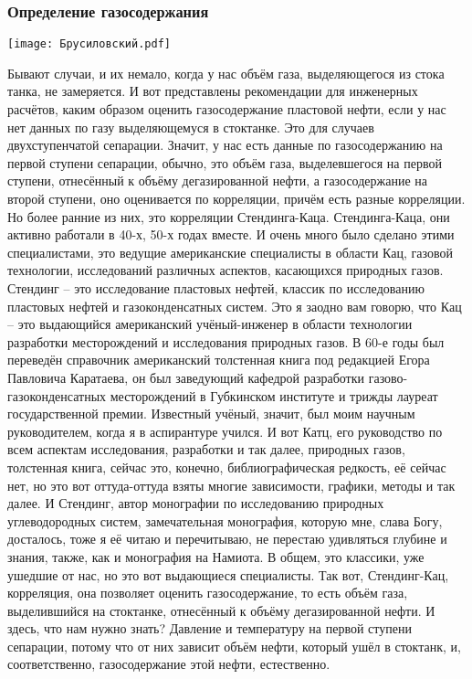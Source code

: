 \documentclass[main.tex]{subfiles}
\begin{document}
\subsubsection{Определение газосодержания}

\begin{center}
\texttt{[image: Брусиловский.pdf]}
\end{center}

Бывают случаи, и их немало, когда у нас объём газа, выделяющегося из стока танка, не замеряется.
И вот представлены рекомендации для инженерных расчётов, каким образом оценить газосодержание пластовой нефти, если у нас нет данных по газу выделяющемуся в стоктанке.
Это для случаев двухступенчатой сепарации.
Значит, у нас есть данные по газосодержанию на первой ступени сепарации, обычно, это объём газа, выделевшегося на первой ступени, отнесённый к объёму дегазированной нефти, а газосодержание на второй ступени, оно оценивается по корреляции, причём есть разные корреляции.
Но более ранние из них, это корреляции Стендинга-Каца.
Стендинга-Каца, они активно работали в 40-х, 50-х годах
вместе.
И очень много было сделано этими специалистами, это ведущие американские специалисты в области Кац, газовой технологии, исследований различных аспектов, касающихся природных газов.
Стендинг -- это исследование пластовых нефтей, классик по исследованию пластовых нефтей и газоконденсатных систем.
Это я заодно вам говорю, что Кац -- это выдающийся американский учёный-инженер в области технологии разработки месторождений и исследования природных газов.
В 60-е годы был переведён справочник американский толстенная книга под редакцией Егора Павловича Каратаева, он был заведующий кафедрой разработки газово-газоконденсатных месторождений в Губкинском институте и трижды лауреат государственной премии.
Известный учёный, значит, был моим научным руководителем, когда я в аспирантуре учился.
И вот Катц, его руководство по всем аспектам исследования, разработки и так далее, природных газов, толстенная книга, сейчас это, конечно, библиографическая редкость, её сейчас нет, но это вот оттуда-оттуда взяты многие зависимости, графики, методы и так далее.
И Стендинг, автор монографии по исследованию природных углеводородных систем, замечательная монография, которую мне, слава Богу, досталось, тоже я её читаю и перечитываю, не перестаю удивляться глубине и знания, также, как и монография на Намиота.
В общем, это классики, уже ушедшие от нас, но это вот выдающиеся специалисты.
Так вот, Стендинг-Кац, корреляция, она позволяет оценить газосодержание, то есть объём газа, выделившийся на стоктанке, отнесённый к объёму дегазированной нефти.
И здесь, что нам нужно знать?
Давление и температуру на первой ступени сепарации, потому что от них зависит объём нефти, который ушёл в стоктанк, и, соответственно, газосодержание этой нефти, естественно.
\end{document}
